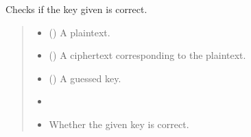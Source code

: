 \documentclass[letterpaper,10pt,english]{sphinxmanual}
\begin{document}
\begin{fulllineitems}
\begin{fulllineitems}
\end{fulllineitems}


\begin{fulllineitems}
\label{\detokenize{MLSCAlib.Ciphers:MLSCAlib.Ciphers.leakage_model.LeakageModel.check_key}}
\pysigstartsignatures
{}
\pysigstopsignatures
\sphinxAtStartPar
Checks if the key given is correct.
\begin{quote}\begin{description}
\begin{itemize}
\item {} 
\sphinxAtStartPar
{} (\sphinxstyleliteralemphasis{\sphinxupquote{{[}}}\sphinxstyleliteralemphasis{\sphinxupquote{{]}}}) \textendash{} A plaintext.

\item {} 
\sphinxAtStartPar
{} (\sphinxstyleliteralemphasis{\sphinxupquote{{[}}}\sphinxstyleliteralemphasis{\sphinxupquote{{]}}}) \textendash{} A ciphertext corresponding to the plaintext.

\item {} 
\sphinxAtStartPar
{} (\sphinxstyleliteralemphasis{\sphinxupquote{{[}}}\sphinxstyleliteralemphasis{\sphinxupquote{{]}}}) \textendash{} A guessed key.

\item {} 
\sphinxAtStartPar
{} \textendash{} 

\item {} 
\sphinxAtStartPar
{} \textendash{} Whether the given key is correct.

\end{itemize}


\end{description}
\end{quote}
\end{fulllineitems}
\end{fulllineitems}
\end{document}
